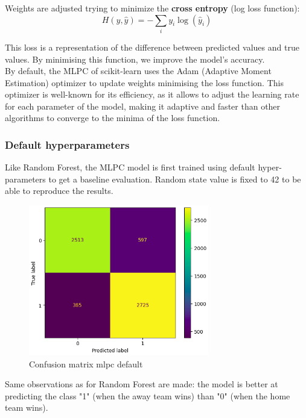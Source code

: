 \documentclass[a4paper,12pt]{article}
\begin{document}
Weights are adjusted trying to minimize the \textbf{cross entropy} (log loss function):
\begin{equation} \label{cross_entropy}
H(y, \hat{y}) = -\sum_{i} y_i \log(\hat{y}_i)
\end{equation}

This loss is a representation of the difference between predicted values and true values. By minimising this function, we improve the model's accuracy.\\

By default, the MLPC of scikit-learn uses the Adam (Adaptive Moment Estimation) optimizer to update weights minimising the loss function. This optimizer is well-known for its efficiency, as it allows to adjust the learning rate for each parameter of the model, making it adaptive and faster than other algorithms to converge to the minima of the loss function.


\subsubsection{Default hyperparameters}

Like Random Forest, the MLPC model is first trained using default hyper-parameters to get a baseline evaluation. Random state value is fixed to 42 to be able to reproduce the results.\\

\begin{figure}[H]
  \centering
  \includegraphics[width=0.7\textwidth]{./images/cm_mlpc_default.png}
  \caption{Confusion matrix mlpc default}
  \label{fig:cm_mlpc_default}
\end{figure}

Same observations as for Random Forest are made: the model is better at predicting the class "1" (when the away team wins) than "0" (when the home team wins).\\
\end{document}
